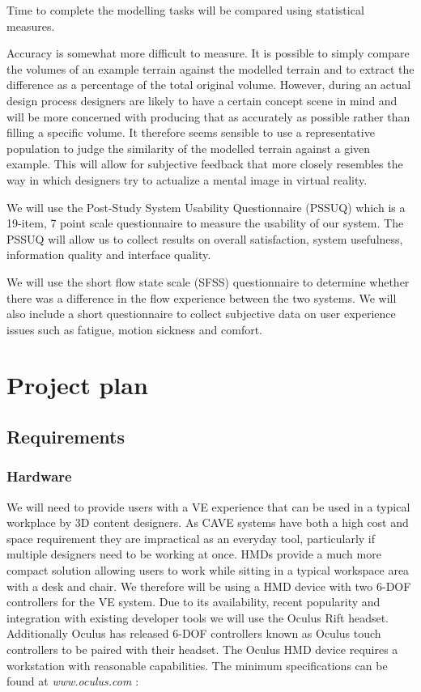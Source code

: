 \documentclass{sig-alternate-05-2015}
\begin{document}
Time to complete the modelling tasks will be compared using statistical measures.

Accuracy is somewhat more difficult to measure. It is possible to simply compare the volumes of an example terrain against the modelled terrain and to extract the difference as a percentage of the total original volume. However, during an actual design process designers are likely to have a certain concept scene in mind and will be more concerned with producing that as accurately as possible rather than filling a specific volume. It therefore seems sensible to use a representative population to judge the similarity of the modelled terrain against a given example. This will allow for subjective feedback that more closely resembles the way in which designers try to actualize a mental image in virtual reality.

We will use the Post-Study System Usability Questionnaire (PSSUQ) which is a 19-item, 7 point scale questionnaire\cite{Lewis1995} to measure the usability of our system. The PSSUQ will allow us to collect results on overall satisfaction, system usefulness, information quality and interface quality.

We will use the short flow state scale (SFSS) questionnaire\cite{jackson2009flow} to determine whether there was a difference in the flow experience between the two systems. We will also include a short questionnaire to collect subjective data on user experience issues such as fatigue, motion sickness and comfort.

\section{Project plan}
\subsection{Requirements}
\subsubsection{Hardware}
We will need to provide users with a VE experience that can be used in a typical workplace by 3D content designers. As CAVE systems have both a high cost and space requirement they are impractical as an everyday tool, particularly if multiple designers need to be working at once. HMDs provide a much more compact solution allowing users to work while sitting in a typical workspace area with a desk and chair. We therefore will be using a HMD device with two 6-DOF controllers for the VE system. Due to its availability, recent popularity and integration with existing developer tools we will use the Oculus Rift headset. Additionally Oculus has released 6-DOF controllers known as Oculus touch controllers to be paired with their headset\cite{Oculus}. The Oculus HMD device requires a workstation with reasonable capabilities. The minimum specifications can be found at \textit{www.oculus.com} \cite{Oculus}:
\end{document}
